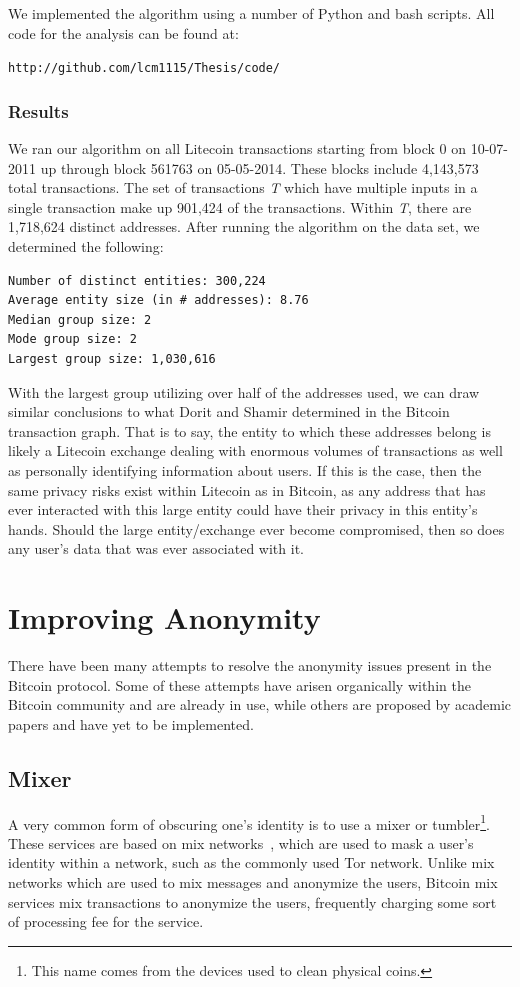 \documentclass[11pt]{article}
\begin{document}
We implemented the algorithm using a number of Python and bash scripts. All code for the analysis can be found at:
    \begin{center} \texttt{http://github.com/lcm1115/Thesis/code/} \end{center}

\subsubsection{Results}
We ran our algorithm on all Litecoin transactions starting from block 0 on 10-07-2011 up through block 561763 on
05-05-2014. These blocks include 4,143,573 total transactions. The set of transactions \emph{T} which have multiple
inputs in a single transaction make up 901,424 of the transactions. Within \emph{T}, there are 1,718,624 distinct
addresses. After running the algorithm on the data set, we determined the following:
\pagebreak
\begin{verbatim}
Number of distinct entities: 300,224
Average entity size (in # addresses): 8.76
Median group size: 2
Mode group size: 2
Largest group size: 1,030,616
\end{verbatim}

With the largest group utilizing over half of the addresses used, we can draw similar conclusions to what Dorit and
Shamir determined in the Bitcoin transaction graph. That is to say, the entity to which these addresses belong is likely
a Litecoin exchange dealing with enormous volumes of transactions as well as personally identifying information about
users\cite{ron13}. If this is the case, then the same privacy risks exist within Litecoin as in Bitcoin, as any address
that has ever interacted with this large entity could have their privacy in this entity's hands.  Should the large
entity/exchange ever become compromised, then so does any user's data that was ever associated with it.

\section{Improving Anonymity}
There have been many attempts to resolve the anonymity issues present in the Bitcoin protocol. Some of these attempts
have arisen organically within the Bitcoin community and are already in use, while others are proposed by academic
papers and have yet to be implemented.

\subsection{Mixer}
A very common form of obscuring one's identity is to use a mixer or tumbler\footnote{This name comes from the devices
used to clean physical coins.}.  These services are based on mix networks~\cite{chaum81}, which are used to mask a
user's identity within a network, such as the commonly used Tor network.  Unlike mix networks which are used to mix
messages and anonymize the users, Bitcoin mix services mix transactions to anonymize the users, frequently charging some
sort of processing fee for the service.
\end{document}
